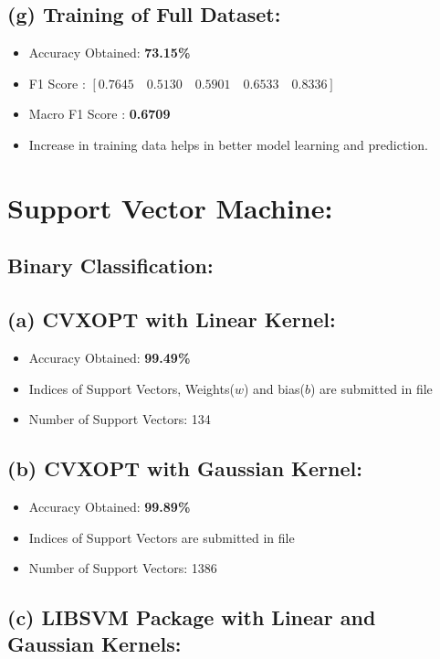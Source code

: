 \documentclass[a4 paper]{article}
\begin{document}
\subsection*{(g) Training of Full Dataset:}
	\begin{itemize}
	\item Accuracy Obtained: \textbf{73.15\%}
	\item F1 Score : $ [0.7645 \quad 0.5130 \quad 0.5901 \quad 0.6533 \quad 0.8336] $
	\item Macro F1 Score : \textbf{0.6709}
	\item Increase in training data helps in better model learning and prediction.
	\end{itemize}

\section{Support Vector Machine:}
\subsection{Binary Classification:}
\vspace*{4mm}
\subsection*{(a) CVXOPT with Linear Kernel:}
	\begin{itemize}
	\item Accuracy Obtained: \textbf{99.49\%}
	\item Indices of Support Vectors, Weights($w$) and bias($b$) are submitted in file 
	\item Number of Support Vectors: 134
	\end{itemize}

\subsection*{(b) CVXOPT with Gaussian Kernel:}
	\begin{itemize}
	\item Accuracy Obtained: \textbf{99.89\%}
	\item Indices of Support Vectors are submitted in file 
	\item Number of Support Vectors: 1386
	\end{itemize}

\subsection*{(c) LIBSVM Package with Linear and Gaussian Kernels:}
\end{document}
